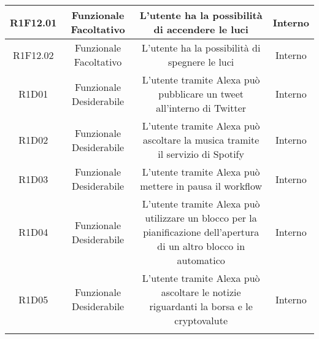 \begin{tabularx}{\textwidth}{|C|C|C|C|}
	\hline
	R1F12.01&Funzionale Facoltativo  &L'utente ha la possibilità di accendere le luci &Interno \\
	\hline
	R1F12.02&Funzionale Facoltativo  &L'utente ha la possibilità di spegnere le luci &Interno \\
	\hline
	R1D01&Funzionale Desiderabile  &L'utente tramite Alexa può pubblicare un tweet all'interno di Twitter &Interno \\
	\hline
	R1D02&Funzionale Desiderabile  &L'utente tramite Alexa può ascoltare la musica tramite il servizio di Spotify &Interno \\
	\hline
	R1D03&Funzionale Desiderabile  &L'utente tramite Alexa può mettere in pausa il workflow &Interno \\
	\hline
	R1D04&Funzionale Desiderabile  &L'utente tramite Alexa può utilizzare un blocco per la pianificazione dell'apertura di un altro blocco in automatico &Interno \\
	\hline
	R1D05&Funzionale Desiderabile  &L'utente tramite Alexa può ascoltare le notizie riguardanti la borsa e le cryptovalute &Interno \\
	\hline
	\caption{Tabella requisiti funzionali}
\end{tabularx}


